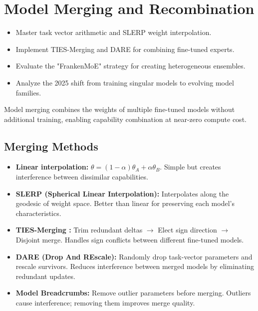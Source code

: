 \chapter{Model Merging and Recombination}
\minitoc

\begin{chapteroverview}
  \begin{itemize}
    \item Master task vector arithmetic and SLERP weight interpolation.
    \item Implement TIES-Merging and DARE for combining fine-tuned experts.
    \item Evaluate the "FrankenMoE" strategy for creating heterogeneous ensembles.
    \item Analyze the 2025 shift from training singular models to evolving model families.
  \end{itemize}
\end{chapteroverview}

Model merging combines the weights of multiple fine-tuned models without additional training, enabling capability combination at near-zero compute cost.

\section{Merging Methods}

\begin{itemize}
  \item \textbf{Linear interpolation:} $\theta = (1-\alpha)\theta_A + \alpha\theta_B$. Simple but creates interference between dissimilar capabilities.
  \item \textbf{SLERP (Spherical Linear Interpolation):} Interpolates along the geodesic of weight space. Better than linear for preserving each model's characteristics.
  \item \textbf{TIES-Merging \parencite{yadav2023ties}:} Trim redundant deltas $\rightarrow$ Elect sign direction $\rightarrow$ Disjoint merge. Handles sign conflicts between different fine-tuned models.
  \item \textbf{DARE \parencite{yu2023language} (Drop And REscale):} Randomly drop task-vector parameters and rescale survivors. Reduces interference between merged models by eliminating redundant updates.
  \item \textbf{Model Breadcrumbs:} Remove outlier parameters before merging. Outliers cause interference; removing them improves merge quality.
\end{itemize}

